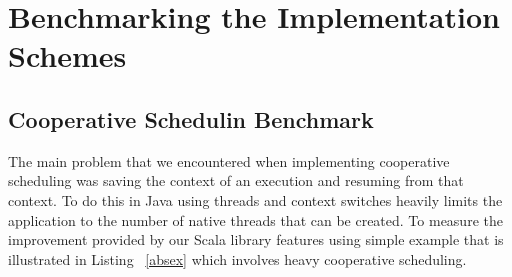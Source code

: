\section{Benchmarking the Implementation Schemes}
\label{bench}

\subsection{Cooperative Schedulin Benchmark}
The main problem that we encountered when implementing cooperative scheduling was saving the context of an execution and resuming from that context. To do this in Java using threads and context switches heavily limits the application to the number of native threads that can be created.  To measure the improvement provided by our Scala library features using simple example that is illustrated in Listing ~\ref{absex} which involves heavy cooperative scheduling. 


